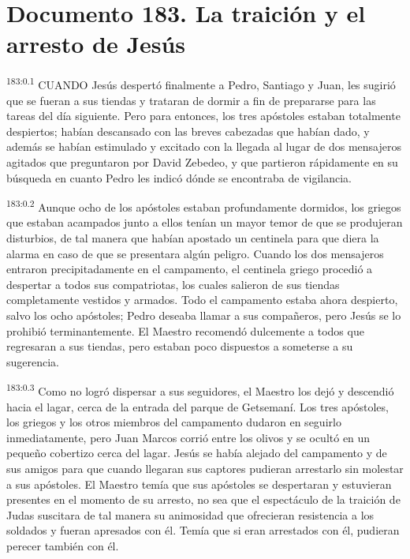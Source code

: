 \chapter{Documento 183. La traición y el arresto de Jesús}
\par 
\textsuperscript{183:0.1} CUANDO Jesús despertó finalmente a Pedro, Santiago y Juan, les sugirió que se fueran a sus tiendas y trataran de dormir a fin de prepararse para las tareas del día siguiente. Pero para entonces, los tres apóstoles estaban totalmente despiertos; habían descansado con las breves cabezadas que habían dado, y además se habían estimulado y excitado con la llegada al lugar de dos mensajeros agitados que preguntaron por David Zebedeo, y que partieron rápidamente en su búsqueda en cuanto Pedro les indicó dónde se encontraba de vigilancia.

\par 
\textsuperscript{183:0.2} Aunque ocho de los apóstoles estaban profundamente dormidos, los griegos que estaban acampados junto a ellos tenían un mayor temor de que se produjeran disturbios, de tal manera que habían apostado un centinela para que diera la alarma en caso de que se presentara algún peligro. Cuando los dos mensajeros entraron precipitadamente en el campamento, el centinela griego procedió a despertar a todos sus compatriotas, los cuales salieron de sus tiendas completamente vestidos y armados. Todo el campamento estaba ahora despierto, salvo los ocho apóstoles; Pedro deseaba llamar a sus compañeros, pero Jesús se lo prohibió terminantemente. El Maestro recomendó dulcemente a todos que regresaran a sus tiendas, pero estaban poco dispuestos a someterse a su sugerencia.

\par 
\textsuperscript{183:0.3} Como no logró dispersar a sus seguidores, el Maestro los dejó y descendió hacia el lagar, cerca de la entrada del parque de Getsemaní. Los tres apóstoles, los griegos y los otros miembros del campamento dudaron en seguirlo inmediatamente, pero Juan Marcos corrió entre los olivos y se ocultó en un pequeño cobertizo cerca del lagar. Jesús se había alejado del campamento y de sus amigos para que cuando llegaran sus captores pudieran arrestarlo sin molestar a sus apóstoles. El Maestro temía que sus apóstoles se despertaran y estuvieran presentes en el momento de su arresto, no sea que el espectáculo de la traición de Judas suscitara de tal manera su animosidad que ofrecieran resistencia a los soldados y fueran apresados con él. Temía que si eran arrestados con él, pudieran perecer también con él.

